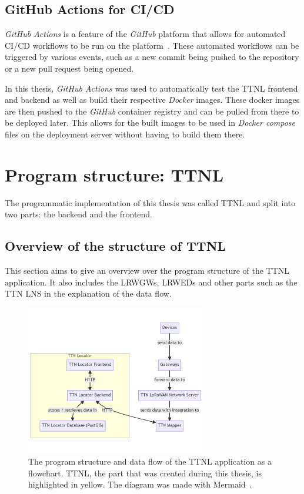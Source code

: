 \subsection{GitHub Actions for \acl{CI/CD}}

\emph{GitHub Actions} is a feature of the \emph{GitHub} platform that allows for automated \ac{CI/CD} workflows to be run on the platform~\cite{github_inc_features_2023}.
These automated workflows can be triggered by various events, such as a new commit being pushed to the repository or a new pull request being opened.

In this thesis, \emph{GitHub Actions} was used to automatically test the \ac{TTNL} frontend and backend as well as build their respective \emph{Docker} images.
These docker images are then pushed to the \emph{GitHub} container registry and can be pulled from there to be deployed later.
This allows for the built images to be used in \emph{Docker compose} files on the deployment server without having to build them there.

\section{Program structure: \acl{TTNL}}\label{section:ttnl}

The programmatic implementation of this thesis was called \acf{TTNL} and split into two parts: the backend and the frontend.

\subsection{Overview of the structure of \acl{TTNL}}

This section aims to give an overview over the program structure of the \ac{TTNL} application.
It also includes the \aclp{LRWGW}, \aclp{LRWED} and other parts such as the \ac{TTN} \ac{LNS} in the explanation of the data flow.

\begin{figure}[htbp]
    \centering
    \includegraphics[width=0.7\textwidth]{pictures/ttn-locator/program_structure.png}
    \caption{
        The program structure and data flow of the \ac{TTNL} application as a flowchart.
        \ac{TTNL}, the part that was created during this thesis, is highlighted in yellow.
        The diagram was made with Mermaid~\cite{mermaid_mermaid_2023}.
    }\label{pic:program-structure}
\end{figure}

